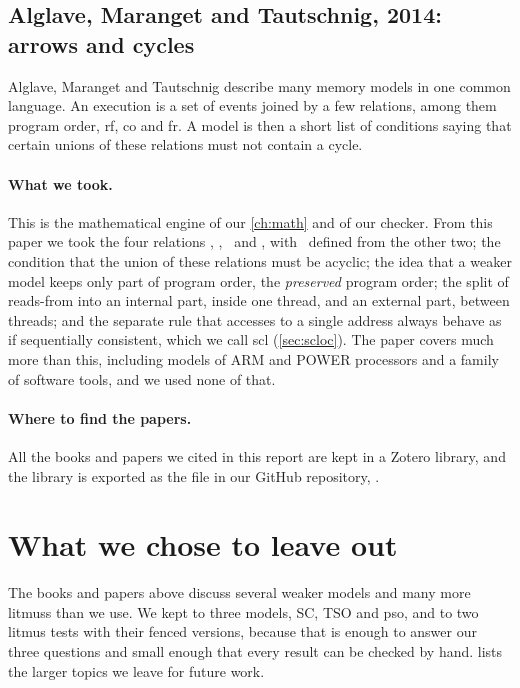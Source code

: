 \subsection{Alglave, Maranget and Tautschnig, 2014: arrows and cycles}
\label{sec:alglave}

Alglave, Maranget and Tautschnig\cite{alglave2014herding} describe many memory models in one common language. An execution is a set of events joined by a few relations, among them program order, \gls{rf}, \gls{co} and \gls{fr}. A model is then a short list of conditions saying that certain unions of these relations must not contain a cycle.

\paragraph{What we took.} This is the mathematical engine of our \cref{ch:math} and of our checker. From this paper we took the four relations \po, \rf, \co\ and \fr, with \fr\ defined from the other two; the condition that the union of these relations must be acyclic; the idea that a weaker model keeps only part of program order, the \emph{preserved} program order; the split of reads-from into an internal part, inside one thread, and an external part, between threads; and the separate rule that accesses to a single address always behave as if sequentially consistent, which we call \gls{scl} (\cref{sec:scloc}). The paper covers much more than this, including models of ARM and POWER processors and a family of software tools, and we used none of that.

\paragraph{Where to find the papers.} All the books and papers we cited in this report are kept in a Zotero library, and the library is exported as the file  in our GitHub repository, \repourl.

\section{What we chose to leave out}

The books and papers above discuss several weaker models and many more \gls{litmus}s than we use. We kept to three models, SC, TSO and \gls{pso}, and to two litmus tests with their fenced versions, because that is enough to answer our three questions and small enough that every result can be checked by hand.  lists the larger topics we leave for future work.

